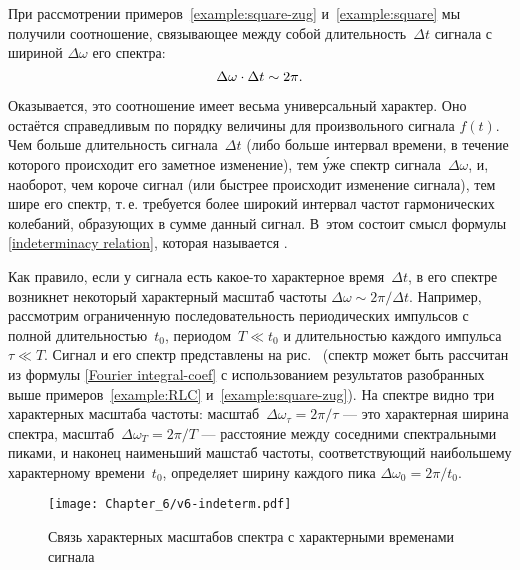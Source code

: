 При рассмотрении примеров~\ref{example:square-zug} и~\ref{example:square}
мы получили соотношение, связывающее между собой
длительность~$\Delta t$ сигнала с шириной $\Delta \omega$ его спектра:
\begin{equation}
    \eqmark{indeterminacy relation}
    \Delta\omega \cdot \Delta t \sim 2\pi.
\end{equation}

Оказывается, это соотношение имеет весьма универсальный характер.
Оно остаётся справедливым по порядку величины для произвольного сигнала $f(t)$.
Чем больше длительность сигнала~$\Delta t$ (либо больше интервал времени,
в течение которого происходит его заметное изменение), тем \'{у}же спектр
сигнала~$\Delta\omega$, и, наоборот, чем короче сигнал (или быстрее происходит
изменение сигнала), тем шире его спектр, т.\,е. требуется более широкий интервал
частот гармонических колебаний, образующих в сумме данный сигнал.
В~этом состоит смысл формулы \eqref{indeterminacy relation},
которая называется .

Как правило, если у сигнала есть какое-то характерное время~$\Delta t$,
в его спектре возникнет некоторый характерный масштаб
частоты $\Delta \omega \sim 2\pi / \Delta t$. Например, рассмотрим ограниченную
последовательность периодических импульсов с полной длительностью~$t_0$,
периодом~$T\ll t_0$ и длительностью каждого импульса~$\tau\ll T$.
Сигнал и его спектр представлены на рис.~
(спектр может быть рассчитан из формулы \eqref{Fourier integral-coef}
с использованием результатов разобранных выше примеров~\ref{example:RLC}
и~\ref{example:square-zug}). На спектре видно три характерных масштаба частоты:
масштаб~$\Delta \omega_{\tau} = 2\pi/\tau$ --- это характерная ширина спектра,
масштаб~$\Delta \omega_T = 2\pi / T$ --- расстояние между соседними
спектральными пиками, и наконец наименьший машстаб частоты,
соответствующий наибольшему характерному времени~$t_0$, 
определяет ширину каждого пика $\Delta \omega_0 = 2\pi /t_0$.


\begin{figure}[h!]
\centering\texttt{[image: Chapter\_6/v6-indeterm.pdf]}
\caption{Связь характерных масштабов спектра 
    с характерными временами сигнала}
\end{figure}



